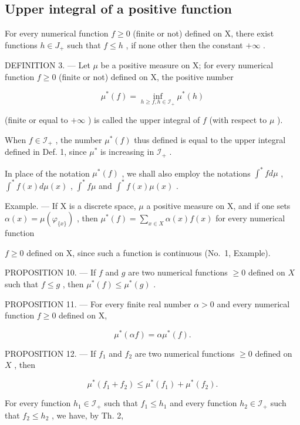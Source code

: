 \subsection{Upper integral of a positive function}

For every numerical function \(f \geqslant 0\) (finite or not) defined on X, there exist functions \(h \in J_{+}\) such that \(f \leqslant h\) , if none other then the constant \(+\infty\) .

DEFINITION 3. --- Let \(\mu\) be a positive measure on X; for every numerical function \(f \geqslant 0\) (finite or not) defined on X, the positive number

\[
\mu^ {*} (f) = \inf _ {h \geqslant f, h \in \mathscr {I} _ {+}} \mu^ {*} (h)
\]

(finite or equal to \(+\infty\) ) is called the upper integral of \(f\) (with respect to \(\mu\) ).

When \(f \in \mathcal{I}_+\) , the number \(\mu^*(f)\) thus defined is equal to the upper integral defined in Def. 1, since \(\mu^*\) is increasing in \(\mathcal{I}_+\) .

In place of the notation \(\mu^{*}(f)\) , we shall also employ the notations \(\int^{*} f d\mu\) , \(\int^{*} f(x) d\mu(x)\) , \(\int^{*} f\mu\) and \(\int^{*} f(x)\mu(x)\) .

Example. --- If X is a discrete space, \(\mu\) a positive measure on X, and if one sets \(\alpha(x) = \mu(\varphi_{\{x\}})\) , then \(\mu^{*}(f) = \sum_{x \in X} \alpha(x)f(x)\) for every numerical function

\(f \geqslant 0\) defined on X, since such a function is continuous (No.~1, Example).

PROPOSITION 10. --- If \(f\) and \(g\) are two numerical functions \(\geqslant 0\) defined on \(X\) such that \(f \leqslant g\) , then \(\mu^{*}(f) \leqslant \mu^{*}(g)\) .

PROPOSITION 11. --- For every finite real number \(\alpha > 0\) and every numerical function \(f \geqslant 0\) defined on X,

\[
\mu^ {*} (\alpha f) = \alpha \mu^ {*} (f).\tag{8}
\]

PROPOSITION 12. --- If \(f_1\) and \(f_2\) are two numerical functions \(\geqslant 0\) defined on \(X\) , then

\[
\mu^ {*} (f _ {1} + f _ {2}) \leqslant \mu^ {*} (f _ {1}) + \mu^ {*} (f _ {2}).\tag{9}
\]

For every function \(h_1 \in \mathcal{I}_+\) such that \(f_1 \leqslant h_1\) and every function \(h_2 \in \mathcal{I}_+\) such that \(f_2 \leqslant h_2\) , we have, by Th. 2,

